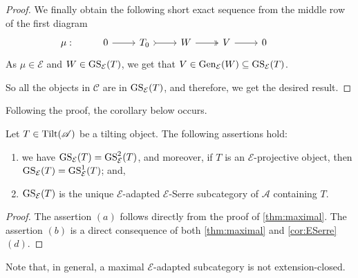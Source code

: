 \begin{proof}
We finally obtain the following short exact sequence from the middle row of the first diagram
\[\begin{tikzcd}
    \mu: & 0 & T_0 & W & V &  0 & 
	\arrow[from=1-2, to=1-3]
	\arrow[tail, from=1-3, to=1-4]
	\arrow[two heads,from=1-4, to=1-5]
	\arrow[from=1-5, to=1-6]
\end{tikzcd}\]
As $\mu \in \mathcal{E}$ and $W \in \operatorname{GS}_\mathcal{E}(T)$, we get that $V \in \operatorname{Gen}_\mathcal{E}(W) \subseteq \operatorname{GS}_\mathcal{E}(T)$. 

So all the objects in $\mathscr{C}$ are in $\operatorname{GS}_\mathcal{E}(T)$, and therefore, we get the desired result.
\end{proof}

Following the proof, the corollary below occurs.

\begin{cor} \label{cor:GS2=GSanduniqueESerre}
   Let $T \in \operatorname{Tilt}(\mathscr{A})$ be a tilting object. The following assertions hold:
   \begin{enumerate}[label=$(\alph*)$, itemsep=1mm]
       \item we have $\operatorname{GS}_\mathcal{E}(T) = \operatorname{GS}_\mathcal{E}^2(T)$, and moreover, if $T$ is an $\mathcal{E}$-projective object, then $\operatorname{GS}_\mathcal{E}(T) = \operatorname{GS}_\mathcal{E}^1(T)$; and,
       \item $\operatorname{GS}_\mathcal{E}(T)$ is the unique $\mathcal{E}$-adapted $\mathcal{E}$-Serre subcategory of $\mathscr{A}$ containing $T$.
   \end{enumerate}
\end{cor}

\begin{proof}
    The assertion $(a)$ follows directly from the proof of \cref{thm:maximal}. The assertion $(b)$ is a direct consequence of both \cref{thm:maximal} and \cref{cor:ESerre} $(d)$.
\end{proof}

Note that, in general, a maximal $\mathcal{E}$-adapted subcategory is not extension-closed. 


